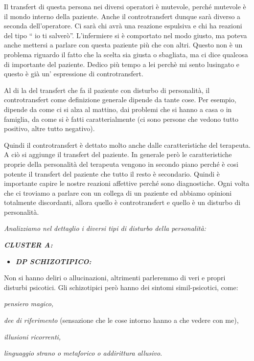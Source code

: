 \documentclass[]{article}
\begin{document}
Il transfert di questa persona nei diversi operatori è mutevole, perché
mutevole è il mondo interno della paziente. Anche il controtransfert
dunque sarà diverso a seconda dell'operatore. Ci sarà chi avrà una
reazione espulsiva e chi ha reazioni del tipo `` io ti salverò''.
L'infermiere si è comportato nel modo giusto, ma poteva anche mettersi a
parlare con questa paziente più che con altri. Questo non è un problema
riguardo il fatto che la scelta sia giusta o sbagliata, ma ci dice
qualcosa di importante del paziente. Dedico più tempo a lei perchè mi
sento lusingato e questo è già un' espressione di controtransfert.

Al di la del transfert che fa il paziente con disturbo di personalità,
il controtransfert come definizione generale dipende da tante cose. Per
esempio, dipende da come ci si alza al mattino, dai problemi che si
hanno a casa o in famiglia, da come si è fatti caratterialmente (ci sono
persone che vedono tutto positivo, altre tutto negativo).

Quindi il controtransfert è dettato molto anche dalle caratteristiche
del terapeuta. A ciò si aggiunge il transfert del paziente. In generale
però le caratteristiche proprie della personalità del terapeuta vengono
in secondo piano perché è cosi potente il transfert del paziente che
tutto il resto è secondario. Quindi è importante capire le nostre
reazioni affettive perché sono diagnostiche. Ogni volta che ci troviamo
a parlare con un collega di un paziente ed abbiamo opinioni totalmente
discordanti, allora quello è controtransfert e quello è un disturbo di
personalità.

\emph{Analizziamo nel dettaglio i diversi tipi di disturbo della
personalità:}

\textbf{\emph{CLUSTER A:}}

\begin{itemize}
\item
  \textbf{\emph{DP SCHIZOTIPICO:}}
\end{itemize}

Non si hanno deliri o allucinazioni, altrimenti parleremmo di veri e
propri disturbi psicotici. Gli schizotipici però hanno dei sintomi
simil-psicotici, come:

\emph{pensiero magico,}

\emph{dee di riferimento} (sensazione che le cose intorno hanno a che
vedere con me),

\emph{illusioni ricorrenti,}

\emph{linguaggio strano o metaforico o addirittura allusivo}.
\end{document}
